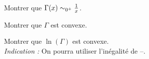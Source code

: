 
\begin{exercice}
\begin{questions}
\item Montrer que $\Gamma(x) \isEquivTo{0^+} \frac{1}{x}$.

\item Montrer que $\Gamma$ est convexe.

\item Montrer que $\ln(\Gamma)$ est convexe.\\
\emph{Indication :} On pourra utiliser l'inégalité de --.
\end{questions}
\end{exercice}

